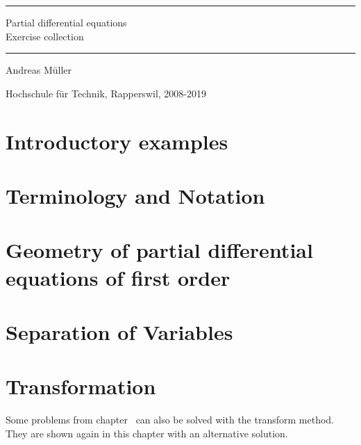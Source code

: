\documentclass[a4paper,12pt]{book}
\begin{document}
\pagestyle{fancy}
\rhead{}
\frontmatter
\newcommand\HRule{\noindent\rule{\linewidth}{1.5pt}}
\begin{titlepage}
\HRule
\vspace*{2pt}
\begin{flushright}
{\Huge
Partial differential equations\\
\bigskip
Exercise collection}
\end{flushright}
\HRule
\begin{flushright}
\vspace{30pt}
\LARGE
Andreas Müller
\end{flushright}
\begin{center}
Hochschule für Technik, Rapperswil, 2008-2019
\end{center}
\end{titlepage}
\hypersetup{
	colorlinks=true,
	linktoc=all,
	linkcolor=blue
}
\tableofcontents
\newenvironment{beispiel}[1][Example]{%
\begin{proof}[#1]%
\renewcommand{\qedsymbol}{$\bigcirc$}
}{\end{proof}}
\mainmatter


\chapter{Introductory examples}

\chapter{Terminology and Notation}

\chapter{Geometry of partial differential equations of first order}

\chapter{Separation of Variables\label{chapter:separation}}

\chapter{Transformation}
Some problems from chapter~\label{chapter:separation}
can also be solved with the transform method.
They are shown again in this chapter with an alternative solution.
\bigskip
\end{document}
